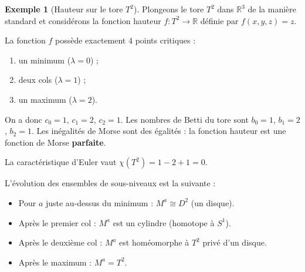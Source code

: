 \documentclass[12pt,a4paper,openany]{book}
\theoremstyle{definition}
\newtheorem{exemple}[definition]{Exemple}
\theoremstyle{plain}
\theoremstyle{remark}
\newcommand{\R}{\mathbb{R}}
\begin{document}
\begin{exemple}[Hauteur sur le tore $T^2$]\label{ex:morse-tore}
Plongeons le tore $T^2$ dans $\R^3$ de la manière standard et considérons la
fonction hauteur $f : T^2 \to \R$ définie par $f(x,y,z) = z$.

\begin{center}
\label{fig:morse-tore}
\end{center}

La fonction $f$ possède exactement $4$ points critiques :
\begin{enumerate}
  \item un minimum ($\lambda = 0$) ;
  \item deux cols ($\lambda = 1$) ;
  \item un maximum ($\lambda = 2$).
\end{enumerate}
On a donc $c_0 = 1$, $c_1 = 2$, $c_2 = 1$. Les nombres de Betti du tore sont
$b_0 = 1$, $b_1 = 2$, $b_2 = 1$. Les inégalités de Morse sont des égalités :
la fonction hauteur est une fonction de Morse \textbf{parfaite}.

La caractéristique d'Euler vaut $\chi(T^2) = 1 - 2 + 1 = 0$.

L'évolution des ensembles de sous-niveaux est la suivante :
\begin{itemize}
  \item Pour $a$ juste au-dessus du minimum : $M^a \cong D^2$ (un disque).
  \item Après le premier col : $M^a$ est un cylindre (homotope à $S^1$).
  \item Après le deuxième col : $M^a$ est homéomorphe à $T^2$ privé d'un disque.
  \item Après le maximum : $M^a = T^2$.
\end{itemize}


\end{exemple}
\end{document}

